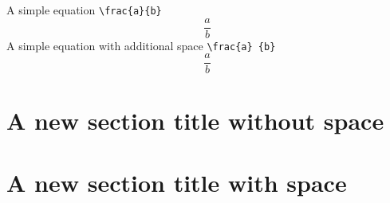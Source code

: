 \documentclass{article}
\begin{document}
A simple equation \verb|\frac{a}{b}|
\begin{displaymath}
\frac{a}{b}
\end{displaymath}
A simple equation with additional space \verb|\frac{a} {b}|
\begin{displaymath}
\frac{a}
 {b}
\end{displaymath}

\section [Section without space]{A new section title without space}

\section [Section with space] {A new section title with space}
\end{document}
